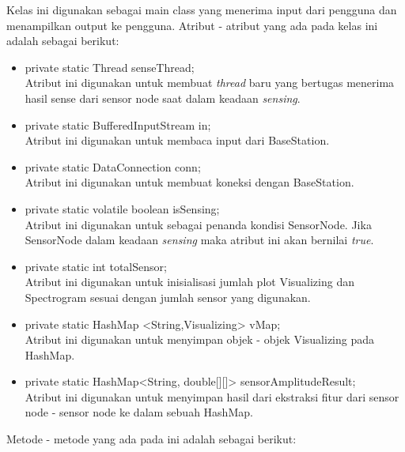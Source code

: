 \newpage
Kelas ini digunakan sebagai main class yang menerima input dari pengguna dan menampilkan output ke pengguna. Atribut - atribut yang ada pada kelas ini adalah sebagai berikut:
\begin{itemize}
	\item private static Thread senseThread; \\
		Atribut ini digunakan untuk membuat {\it thread} baru yang bertugas menerima hasil sense dari sensor node saat dalam keadaan {\it sensing}.
	\item private static BufferedInputStream in; \\
		Atribut ini digunakan untuk membaca input dari BaseStation.
	\item private static DataConnection conn; \\
		Atribut ini digunakan untuk membuat koneksi dengan BaseStation.
	\item private static volatile boolean isSensing; \\
		Atribut ini digunakan untuk sebagai penanda kondisi SensorNode. Jika SensorNode dalam keadaan {\it sensing} maka atribut ini akan bernilai {\it true}.
	\item private static int totalSensor; \\
		Atribut ini digunakan untuk inisialisasi jumlah plot Visualizing dan Spectrogram sesuai dengan jumlah sensor yang digunakan.
	\item private static HashMap <String,Visualizing> vMap; \\
		Atribut ini digunakan untuk menyimpan objek - objek Visualizing pada HashMap.
	\item private static HashMap<String, double[][]> sensorAmplitudeResult; \\
		Atribut ini digunakan untuk menyimpan hasil dari ekstraksi fitur dari sensor node - sensor node ke dalam sebuah HashMap.
\end{itemize}
Metode - metode yang ada pada ini adalah sebagai berikut:
